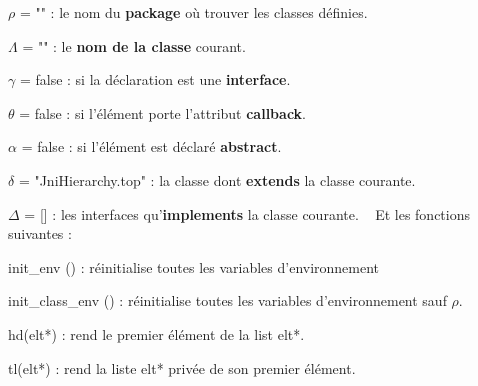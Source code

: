 \documentclass[a4paper, 11pt, notitlepage]{article}
\begin{document}
$\rho$ = "" : le nom du \textbf{package} où trouver les classes définies.

$\Lambda$ = "" : le \textbf{nom de la classe} courant.

$\gamma$ = false : si la déclaration est une \textbf{interface}.

$\theta$ = false : si l'élément porte l'attribut \textbf{callback}.

$\alpha$ = false : si l'élément est déclaré \textbf{abstract}.

$\delta$ = "JniHierarchy.top" : la classe dont \textbf{extends} la classe courante.

$\Delta$ = [] : les interfaces qu'\textbf{implements} la classe courante.
\ %
\newline
\noindent
Et les fonctions suivantes :

init\_env () : réinitialise toutes les variables d'environnement 

init\_class\_env () : réinitialise toutes les variables d'environnement sauf $\rho$.

hd(elt*) : rend le premier élément de la list elt*.

tl(elt*) : rend la liste elt* privée de son premier élément.
\end{document}
